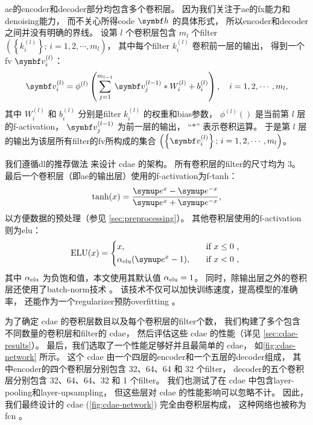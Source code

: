 \ac{ae}的\ac{encoder}和\ac{decoder}部分均包含多个卷积层。
因为我们关注于\ac{ae}的\ac{fx}能力和\ac{denoising}能力，
而不关心所得\ac{code} $\B{h}$ 的具体形式，
所以\ac{encoder}和\ac{decoder}之间并没有明确的界线。
设第 $l$ 个卷积层包含 $m_l$ 个\ac{filter}
$\left(\left\{ k_{i}^{(l)} \right\};\, i = 1, 2, \cdots, m_l \right)$，
其中每个\ac{filter} $k_{i}^{(l)}$ 卷积前一层的输出，
得到一个\ac{fv} $\B{v}_{i}^{(l)}$：
\begin{equation}
  \label{eq:conv}
  \B{v}_{i}^{(l)} = \phi^{(l)} \left( \sum_{j=1}^{m_{l-1}}
    \B{v}_{j}^{(l-1)} * W_i^{(l)} + b_i^{(l)} \right) ,
    \quad i = 1, 2, \cdots, m_{l} ,
\end{equation}
其中
$W_i^{(l)}$ 和 $b_i^{(l)}$ 分别是\ac{filter} $k_{i}^{(l)}$
的权重和\ac{bias}参数，
$\phi^{(l)}()$ 是当前第 $l$ 层的\ac{f-activation}，
$\B{v}_{j}^{(l-1)}$ 为前一层的输出，
\enquote{$*$} 表示卷积运算。
于是第 $l$ 层的输出为该层所有\ac{filter}的\ac{fv}所构成的集合
$\left(\left\{ \B{v}_{i}^{(l)} \right\};\, i = 1, 2, \cdots, m_l \right)$。

我们遵循\ac{dl}的推荐做法\cite{geron2017,suganuma2018} 来设计 \ac{cdae} 的架构。
所有卷积层的\ac{filter}的尺寸均为 3。
最后一个卷积层（即\ac{ae}的输出层）使用的\ac{f-activation}为\ac{f-tanh}：
\begin{equation}
  \tanh(x) = \frac{\Ce^x - \Ce^{-x}}{\Ce^x + \Ce^{-x}} ,
\end{equation}
以方便数据的预处理（参见 \autoref{sec:preprocessing}）。
其他卷积层使用的\ac{f-activation}则为\ac{elu}\cite{clevert2016}：
\begin{equation}
  \text{ELU}(x) =
    \begin{dcases*}
      x , \quad & if $x \le 0$ , \\
      \alpha_{\R{elu}} (\Ce^x - 1) , \quad & if $x < 0$ ,
    \end{dcases*}
\end{equation}
其中 $\alpha_{\mathrm{elu}}$ 为负饱和值，本文使用其默认值 $\alpha_{\mathrm{elu}} = 1$。
同时，除输出层之外的卷积层还使用了\ac{batch-norm}技术 \cite{ioffe2015}。
该技术不仅可以加快训练速度，提高模型的准确率，
还能作为一个\ac{regularizer}预防\ac{overfitting} \cite{geron2017}。

为了确定 \ac{cdae} 的卷积层数目以及每个卷积层的\ac{filter}个数，
我们构建了多个包含不同数量的卷积层和\ac{filter}的 \ac{cdae}，
然后评估这些 \ac{cdae} 的性能（详见 \autoref{sec:cdae-results}）。
最后，我们选取了一个性能足够好并且最简单的 \ac{cdae}，
如\autoref{fig:cdae-network} 所示。
这个 \ac{cdae} 由一个四层的\ac{encoder}和一个五层的\ac{decoder}组成，
其中\ac{encoder}的四个卷积层分别包含 32、64、64 和 32 个\ac{filter}，
\ac{decoder}的五个卷积层分别包含 32、64、64、32 和 1 个\ac{filter}。
我们也测试了在 \ac{cdae} 中包含\ac{layer-pooling}和\ac{layer-upsampling}，
但这些层对 \ac{cdae} 的性能影响可以忽略不计。
因此，我们最终设计的 \ac{cdae} (\autoref{fig:cdae-network}) 完全由卷积层构成，
这种网络也被称为\ac{fcn} \cite{long2015,springenberg2015}。

